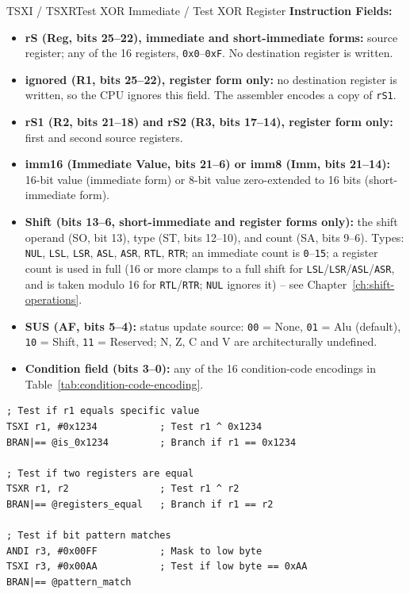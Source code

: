 \begin{instructionbox}{TSXI / TSXR}{Test XOR Immediate / Test XOR Register}
	\textbf{Instruction Fields:}
	\begin{itemize}
		\item \textbf{rS (Reg, bits 25--22), immediate and short-immediate forms:} source register; any of the 16 registers,
		      \texttt{0x0}--\texttt{0xF}. No destination register is written.
		\item \textbf{ignored (R1, bits 25--22), register form only:} no destination register is written, so the CPU ignores
		      this field. The assembler encodes a copy of \texttt{rS1}.
		\item \textbf{rS1 (R2, bits 21--18) and rS2 (R3, bits 17--14), register form only:} first and second source registers.
		\item \textbf{imm16 (Immediate Value, bits 21--6) or imm8 (Imm, bits 21--14):} 16-bit value (immediate form) or 8-bit
		      value zero-extended to 16 bits (short-immediate form).
		\item \textbf{Shift (bits 13--6, short-immediate and register forms only):} the shift operand (SO, bit 13), type (ST, bits 12--10), and count (SA, bits 9--6). Types:
		      \texttt{NUL}, \texttt{LSL},
		      \texttt{LSR}, \texttt{ASL}, \texttt{ASR}, \texttt{RTL}, \texttt{RTR}; an immediate count is
		      \texttt{0}--\texttt{15}; a register count is used in full (16 or more clamps to a full shift for \texttt{LSL}/\texttt{LSR}/\texttt{ASL}/\texttt{ASR}, and is taken modulo 16 for \texttt{RTL}/\texttt{RTR}; \texttt{NUL} ignores it) -- see Chapter~\ref{ch:shift-operations}.
		\item \textbf{SUS (AF, bits 5--4):} status update source: \texttt{00} = None, \texttt{01} = Alu (default), \texttt{10} = Shift, \texttt{11} =
		      Reserved; N, Z, C and V are architecturally undefined.
		\item \textbf{Condition field (bits 3--0):} any of the 16 condition-code encodings in
		      Table~\ref{tab:condition-code-encoding}.
	\end{itemize}

	\begin{example}
		\begin{lstlisting}
; Test if r1 equals specific value
TSXI r1, #0x1234           ; Test r1 ^ 0x1234
BRAN|== @is_0x1234         ; Branch if r1 == 0x1234

; Test if two registers are equal
TSXR r1, r2                ; Test r1 ^ r2
BRAN|== @registers_equal   ; Branch if r1 == r2

; Test if bit pattern matches
ANDI r3, #0x00FF           ; Mask to low byte
TSXI r3, #0x00AA           ; Test if low byte == 0xAA
BRAN|== @pattern_match
		\end{lstlisting}
		\caption{Equality and Pattern Testing with TSX}
	\end{example}


\end{instructionbox}

